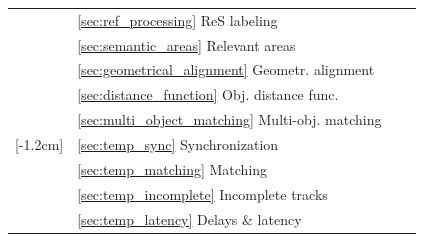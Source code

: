 \documentclass[conference]{IEEEtran}
\begin{document}
\begin{table}[htbp]
\begin{threeparttable}
\begin{tabularx}{\linewidth}{
			>{\hsize=0.02\hsize}X
			>{\hsize=0.38\hsize}X 
			>{\hsize=0.8\hsize}X 
			>{\hsize=0.8\hsize}X 
		}
		                                                                                        & \ref{sec:ref_processing} ReS labeling               & \basicChallengeReSLabling            & \basicDroneReSLabling                                                           \\ \cline{2-4}
		                                                                                        & \ref{sec:semantic_areas} Relevant areas             & \basicChallengeAreas                 & \basicDroneAreas                                                                \\ \cline{2-4}
		                                                                                        & \ref{sec:geometrical_alignment} Geometr. alignment  & \basicChallengeGeometrAlign          & \basicDroneGeometrAlign                                                         \\ \cline{2-4}
		                                                                                        & \ref{sec:distance_function} Obj. distance func.     & \basicChallengeObjDistance           & \basicDroneObjDistance                                                          \\ \cline{2-4}
		                                                                                        & \ref{sec:multi_object_matching} Multi-obj. matching & \basicChallengeMultiObjMatching      & \basicDroneMultiObjMatching                                                     \\ \midrule
		\parbox[t]{2mm}{[-1.2cm]{}}            & \ref{sec:temp_sync} Synchronization                 & \tempChallengeSync                   & \tempDroneSync                                                                  \\ 
		                                                                                        & \ref{sec:temp_matching} Matching                    & \tempChallengeMatching               & \tempDroneMatching                                                              \\ 
		                                                                                        & \ref{sec:temp_incomplete} Incomplete tracks         & \tempChallengeIncomplete             & \tempDroneIncomplete                                                            \\ 
		                                                                                        & \ref{sec:temp_latency} Delays \& latency            & \tempChallengeDelays                 & \tempDroneDelays                                                                \\ \midrule

\end{tabularx}
\end{threeparttable}
\end{table}
\end{document}
